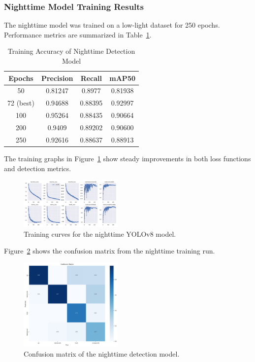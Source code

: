 \subsubsection{Nighttime Model Training Results}

The nighttime model was trained on a low-light dataset for 250 epochs. Performance metrics are summarized in Table~\ref{table:akurasi_model_malam}.

\begin{table}[H]
\caption{Training Accuracy of Nighttime Detection Model}
\label{table:akurasi_model_malam}
\centering
\begin{tabular}{|c|c|c|c|}
\hline
\textbf{Epochs} & \textbf{Precision} & \textbf{Recall} & \textbf{mAP50} \\ \hline
50 & 0.81247 & 0.8977 & 0.81938 \\ \hline
72 (best) & 0.94688 & 0.88395 & 0.92997 \\ \hline
100 & 0.95264 & 0.88435 & 0.90664 \\ \hline
200 & 0.9409 & 0.89202 & 0.90600 \\ \hline
250 & 0.92616 & 0.88637 & 0.88913 \\ \hline
\end{tabular}
\end{table}

The training graphs in Figure~\ref{fig:grafik_model_malam} show steady improvements in both loss functions and detection metrics.

\begin{figure}[H]
\centering
\includegraphics[width=0.45\textwidth]{gambar/grafik_model_malam.png}
\caption{Training curves for the nighttime YOLOv8 model.}
\label{fig:grafik_model_malam}
\end{figure}

Figure~\ref{fig:confusion_matrix_malam} shows the confusion matrix from the nighttime training run.

\begin{figure}[H]
\centering
\includegraphics[width=0.45\textwidth]{gambar/confusion_malam.png}
\caption{Confusion matrix of the nighttime detection model.}
\label{fig:confusion_matrix_malam}
\end{figure}


